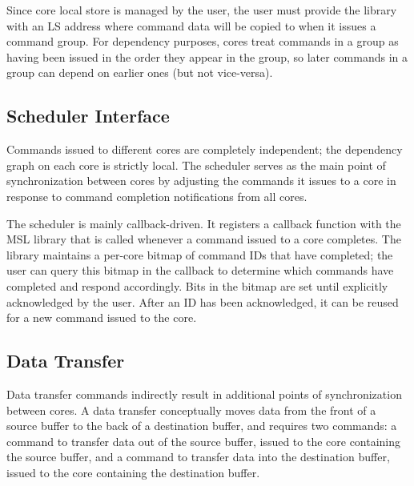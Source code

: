 Since core local store is managed by the user, the user must provide
the library with an LS address where command data will be copied to
when it issues a command group. For dependency purposes, cores treat
commands in a group as having been issued in the order they appear in
the group, so later commands in a group can depend on earlier ones
(but not vice-versa). 

\subsection{Scheduler Interface}

Commands issued to different cores are completely independent; the
dependency graph on each core is strictly local. The scheduler serves
as the main point of synchronization between cores by adjusting the
commands it issues to a core in response to command completion
notifications from all cores.

The scheduler is mainly callback-driven. It registers a callback
function with the MSL library that is called whenever a command issued
to a core completes. The library maintains a per-core bitmap of
command IDs that have completed; the user can query this bitmap in the
callback to determine which commands have completed and respond
accordingly. Bits in the bitmap are set until explicitly acknowledged
by the user. After an ID has been acknowledged, it can be reused for
a new command issued to the core.



\subsection{Data Transfer}

Data transfer commands indirectly result in additional points of
synchronization between cores. A data transfer conceptually moves
data from the front of a source buffer to the back of a destination
buffer, and requires two commands: a command to transfer data out of
the source buffer, issued to the core containing the source
buffer, and a command to transfer data into the destination buffer,
issued to the core containing the destination buffer. 

